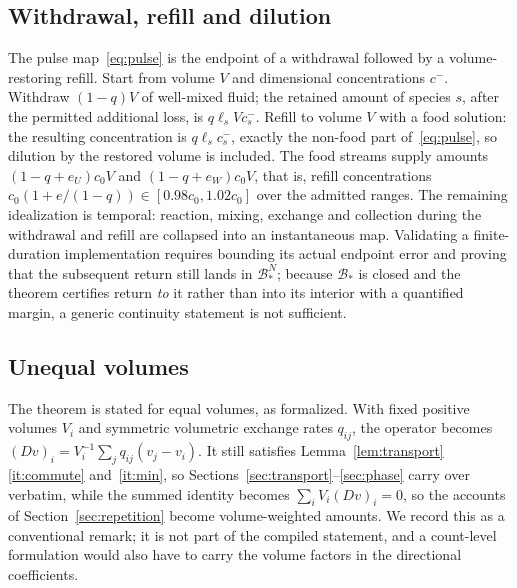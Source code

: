 \documentclass[11pt,a4paper]{article}
\theoremstyle{plain}
\theoremstyle{definition}
\theoremstyle{remark}
\newcommand{\Bstar}{\mathcal B_*}
\newcommand{\Dop}{D}
\begin{document}
\subsection{Withdrawal, refill and dilution}\label{sec:dilution}
The pulse map~\eqref{eq:pulse} is the endpoint of a withdrawal followed by a volume-restoring refill. Start from volume $V$ and dimensional concentrations $c^-$. Withdraw $(1-q)V$ of well-mixed fluid; the retained amount of species $s$, after the permitted additional loss, is $q\ell_sVc_s^-$. Refill to volume $V$ with a food solution: the resulting concentration is $q\ell_sc_s^-$, exactly the non-food part of~\eqref{eq:pulse}, so dilution by the restored volume is included. The food streams supply amounts $(1-q+e_U)c_0V$ and $(1-q+e_W)c_0V$, that is, refill concentrations $c_0(1+e/(1-q))\in[0.98c_0,1.02c_0]$ over the admitted ranges. The remaining idealization is temporal: reaction, mixing, exchange and collection during the withdrawal and refill are collapsed into an instantaneous map. Validating a finite-duration implementation requires bounding its actual endpoint error and proving that the subsequent return still lands in $\Bstar^N$; because $\Bstar$ is closed and the theorem certifies return \emph{to} it rather than into its interior with a quantified margin, a generic continuity statement is not sufficient.

\subsection{Unequal volumes}\label{sec:volumes}
The theorem is stated for equal volumes, as formalized. With fixed positive volumes $V_i$ and symmetric volumetric exchange rates $q_{ij}$, the operator becomes $(\Dop v)_i=V_i^{-1}\sum_jq_{ij}(v_j-v_i)$. It still satisfies Lemma~\ref{lem:transport}\ref{it:commute} and~\ref{it:min}, so Sections~\ref{sec:transport}--\ref{sec:phase} carry over verbatim, while the summed identity becomes $\sum_iV_i(\Dop v)_i=0$, so the accounts of Section~\ref{sec:repetition} become volume-weighted amounts. We record this as a conventional remark; it is not part of the compiled statement, and a count-level formulation would also have to carry the volume factors in the directional coefficients.
\end{document}
